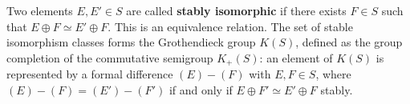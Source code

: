 Two elements $E, E' \in S$ are called \textbf{stably isomorphic} if there exists $F \in S$ such that $E \oplus F \simeq E' \oplus F$. This is an equivalence relation. The set of stable isomorphism classes forms the Grothendieck group $K(S)$, defined as the group completion of the commutative semigroup $K_+(S)$: an element of $K(S)$ is represented by a formal difference $(E) - (F)$ with $E, F \in S$, where $(E) - (F) = (E') - (F')$ if and only if $E \oplus F' \simeq E' \oplus F$ stably.
